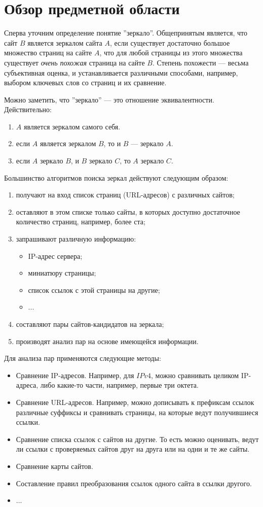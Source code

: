 \section{Обзор предметной области}
Сперва уточним определение понятие ''зеркало''. Общепринятым является, что сайт
$B$ является зеркалом сайта $A$, если существует достаточно большое множество
страниц на сайте $A$, что для любой страницы из этого множества существует
\textit{очень похожая} страница на сайте $B$. Степень похожести — весьма
субъективная оценка, и устанавливается различными способами, например, выбором
ключевых слов со страниц и их сравнение.

Можно заметить, что ''зеркало'' — это отношение эквивалентности. Действительно:
\begin{enumerate}
\item $A$ является зеркалом самого себя.
\item если $A$ является зеркалом $B$, то и $B$ — зеркало $A$.
\item если $A$ зеркало $B$, и $B$ зеркало $C$, то $A$ зеркало $C$.
\end{enumerate}

Большинство алгоритмов поиска зеркал действуют следующим образом:
\begin{enumerate}
\item получают на вход список страниц (URL-адресов) с различных сайтов;
\item оставляют в этом списке только сайты, в которых доступно достаточное
количество страниц, например, более ста;
\item запрашивают различную информацию:
\begin{itemize}
\item IP-адрес сервера;
\item миниатюру страницы;
\item список ссылок с этой страницы на другие;
\item ...
\end{itemize}
\item составляют пары сайтов-кандидатов на зеркала;
\item производят анализ пар на основе имеющейся информации.
\end{enumerate}

Для анализа пар применяются следующие методы:
\begin{itemize}
\item Сравнение IP-адресов. Например, для $IPv4$, можно сравнивать целиком
IP-адреса, либо какие-то части, например, первые три октета.
\item Сравнение URL-адресов. Например, можно дописывать к префиксам ссылок
различные суффиксы и сравнивать страницы, на которые ведут получившиеся ссылки.
\item Сравнение списка ссылок с сайтов на другие. То есть можно оценивать, ведут
ли ссылки с проверяемых сайтов друг на друга или на одни и те же сайты.
\item Сравнение карты сайтов.
\item Составление правил преобразования ссылок одного сайта в ссылки другого. 
\item ...
\end{itemize}


